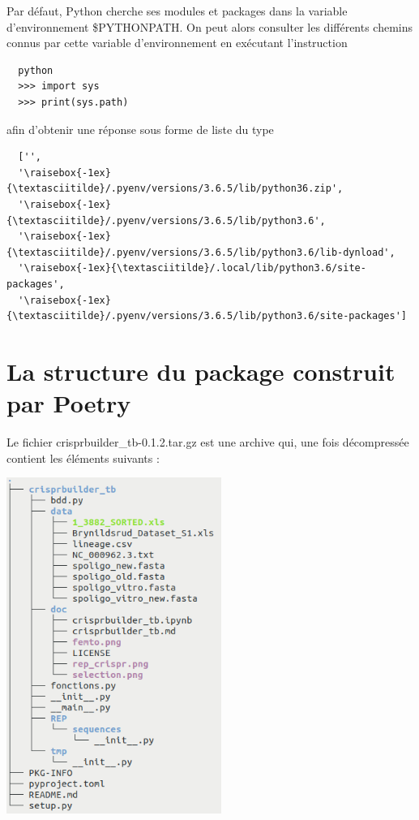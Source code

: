 \documentclass[twoside,a4paper,11pt,frenchb,openany]{report}
\begin{document}
Par défaut, Python cherche ses modules et packages dans la variable d'environnement \$PYTHONPATH. On peut alors consulter les différents chemins connus par cette variable d'environnement en exécutant l'instruction
\begin{verbatim}  python
  >>> import sys
  >>> print(sys.path)\end{verbatim}

afin d'obtenir une réponse sous forme de liste du type
\begin{verbatim}  ['',
  '\raisebox{-1ex}{\textasciitilde}/.pyenv/versions/3.6.5/lib/python36.zip',
  '\raisebox{-1ex}{\textasciitilde}/.pyenv/versions/3.6.5/lib/python3.6',
  '\raisebox{-1ex}{\textasciitilde}/.pyenv/versions/3.6.5/lib/python3.6/lib-dynload',    
  '\raisebox{-1ex}{\textasciitilde}/.local/lib/python3.6/site-packages',
  '\raisebox{-1ex}{\textasciitilde}/.pyenv/versions/3.6.5/lib/python3.6/site-packages']\end{verbatim}



\section{La structure du package construit par Poetry}

Le fichier crisprbuilder\_tb-0.1.2.tar.gz est une archive qui, une fois décompressée contient les éléments suivants :

\includegraphics[width=7cm]{tar.png}
\end{document}
